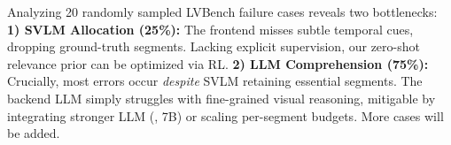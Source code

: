\vspace{-0.2em}
Analyzing 20 randomly sampled LVBench failure cases reveals two bottlenecks: \textbf{1) SVLM Allocation (25\%):} The frontend misses subtle temporal cues, dropping ground-truth segments. Lacking explicit supervision, our zero-shot relevance prior can be optimized via RL. \textbf{2) LLM Comprehension (75\%):} Crucially, most errors occur \textit{despite} SVLM retaining essential segments. The backend LLM simply struggles with fine-grained visual reasoning, mitigable by integrating stronger LLM (\eg, 7B) or scaling per-segment budgets. More cases will be added.